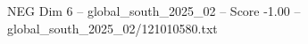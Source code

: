 \begin{textsample}{NEG Dim 6 – global\_south\_2025\_02 – Score -1.00 – global\_south\_2025\_02/121010580.txt}
\end{textsample}
